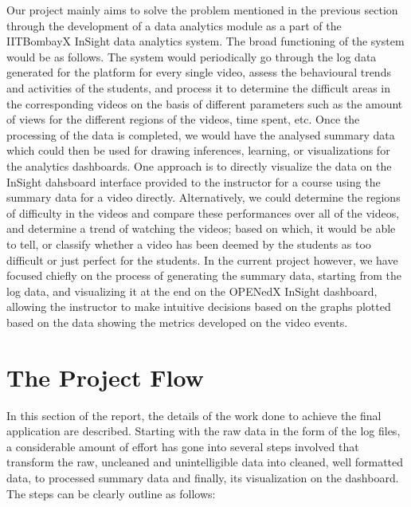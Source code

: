 \documentclass[16pt]{report}
\begin{document}
Our project mainly aims to solve the problem mentioned in the previous section through the development of a data analytics module as a part of the IITBombayX InSight data analytics system. The broad functioning of the system would be as follows. The system would periodically go through the log data generated for the platform for every single video, assess the behavioural trends and activities of the students, and process it to determine the difficult areas in the corresponding videos on the basis of different parameters such as the amount of views for the different regions of the videos, time spent, etc. Once the processing of the data is completed, we would have the analysed summary data which could then be used for drawing inferences, learning, or visualizations for the analytics dashboards. One approach is to directly visualize the data on the InSight dahsboard interface provided to the instructor for a course using the summary data for a video directly. Alternatively, we could determine the regions of difficulty in the videos and compare these performances over all of the videos, and determine a trend of watching the videos; based on which, it would be able to tell, or classify whether a video has been deemed by the students as too difficult or just perfect for the students. In the current project however, we have focused chiefly on the process of generating the summary data, starting from the log data, and visualizing it at the end on the OPENedX InSight dashboard, allowing the instructor to make intuitive decisions based on the graphs plotted based on the data showing the metrics developed on the video events.

\section{The Project Flow}

In this section of the report, the details of the work done to achieve the final application are described. Starting with the raw data in the form of the log files, a considerable amount of effort has gone into several steps involved that transform the raw, uncleaned and unintelligible data into cleaned, well formatted data, to processed summary data and finally, its visualization on the dashboard. The steps can be clearly outline as follows:
\end{document}
